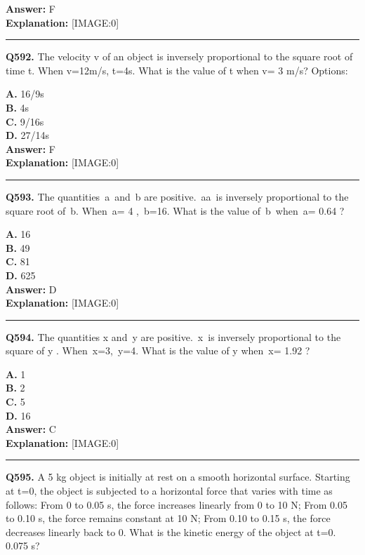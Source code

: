 \documentclass[12pt]{article}
\begin{document}
\textbf{Answer:} F \\
\textbf{Explanation:} [IMAGE:0]

\hrule
\vspace{1em}


\noindent
\textbf{Q592.} The velocity v of an object is inversely proportional to the square root of time t. When v=12m/s, t=4s. What is the value of t when v=
3
m/s?
Options:



\textbf{A.} 16/9s \\
\textbf{B.} 4s \\
\textbf{C.} 9/16s \\
\textbf{D.} 27/14s \\

\textbf{Answer:} F \\
\textbf{Explanation:} [IMAGE:0]

\hrule
\vspace{1em}


\noindent
\textbf{Q593.} The quantities a and b
are positive. aa is inversely proportional to the square root of b. When a=
4
, b=16. What is the value of b when a=
0.64
?



\textbf{A.} 16 \\
\textbf{B.} 49 \\
\textbf{C.} 81 \\
\textbf{D.} 625 \\

\textbf{Answer:} D \\
\textbf{Explanation:} [IMAGE:0]

\hrule
\vspace{1em}


\noindent
\textbf{Q594.} The quantities
x
and y
are positive. x is inversely proportional to the square of
y
. When x=3, y=4. What is the value of
y
when x=
1.92
?



\textbf{A.} 1 \\
\textbf{B.} 2 \\
\textbf{C.} 5 \\
\textbf{D.} 16 \\

\textbf{Answer:} C \\
\textbf{Explanation:} [IMAGE:0]

\hrule
\vspace{1em}


\noindent
\textbf{Q595.} A
5
kg object is initially at rest on a smooth horizontal surface. Starting at t=0, the object is subjected to a horizontal force that varies with time as follows:
\cdot 
From 0 to 0.05 s, the force increases linearly from 0 to 10 N;
\cdot 
From 0.05 to 0.10 s, the force remains constant at 10 N;
\cdot 
From 0.10 to 0.15 s, the force decreases linearly back to 0.
What is the kinetic energy of the object at t=0.
0.075
s?
\end{document}
